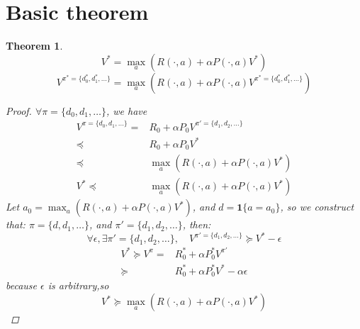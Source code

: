 \documentclass[a4paper]{article}
\newtheorem{thm}{Theorem}[section]
\numberwithin{figure}{section}
\numberwithin{equation}{section}
\begin{document}
\section{Basic theorem}%
\label{sec:basic_theorem}

\begin{thm}
    \[
        V^* = \max_a (R(\cdot, a) + \alpha P(\cdot, a) V^*)
    \]
    \[
        V^{\pi^* = \{ d^*_0, d^*_1, \ldots \}} 
        = \max_a (R(\cdot, a) + \alpha P(\cdot, a) V^{\pi^* = \{ d^*_0, d^*_1, \ldots \}} )
    \]
    \begin{proof}
        $ \forall \pi = \{ d_0, d_1, \ldots \} $, we have
        \begin{align*}
            V^{\pi = \{ d_0, d_1, \ldots \}} 
            =& R_0 + \alpha P_0 V^{\pi' = \{ d_1, d_2, \ldots \}} \\
            \preceq& R_0 + \alpha P_0 V^* \\
            \preceq& \max_a (R(\cdot, a) + \alpha P(\cdot, a) V^*) \\
            V^* \preceq& \max_a (R(\cdot, a) + \alpha P(\cdot, a) V^*) 
        \end{align*}
        Let $ a_0 = \max_a (R(\cdot, a) + \alpha P(\cdot, a) V^*) $, 
        and $ d = \mathbf{1} \{ a = a_0 \} $,
        so we construct that:
        $ \pi = \{ d, d_1, \ldots \} $,
        and $ \pi' = \{ d_1, d_2, \ldots \} $, then:
        \[
            \forall \epsilon, \exists \pi' = \{d_1, d_2, \ldots\}, \quad
            V^{\pi' = \{d_1, d_2, \ldots \}}
            \succeq V^* - \epsilon
        \]
        \begin{align*}
            V^* \succeq V^{\pi} =& R^*_0 + \alpha P^*_0 V^{\pi'} \\
            \succeq& R^*_0 + \alpha P^*_0 V^* - \alpha \epsilon 
        \end{align*}
        because $\epsilon $ is arbitrary,so
        \[
            V^* \succeq \max_a (R(\cdot, a) + \alpha P(\cdot, a) V^*) 
        \]
    \end{proof}
\end{thm}
\end{document}
